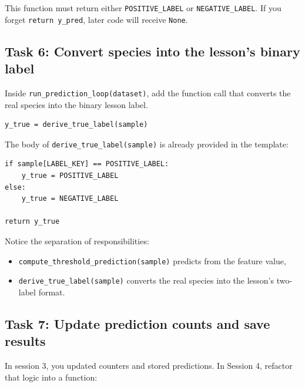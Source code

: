 \begin{tcolorbox}[title=Checkpoint]
This function must return either \texttt{POSITIVE\_LABEL} or \texttt{NEGATIVE\_LABEL}. If you forget \texttt{return y\_pred}, later code will receive \texttt{None}.
\end{tcolorbox}

\subsection{Task 6: Convert species into the lesson's binary label}

\begin{tcolorbox}[title=Task 6: Convert species into the lesson’s binary label]
Inside \texttt{run\_prediction\_loop(dataset)}, add the function call that converts the real species into the binary lesson label.
\end{tcolorbox}

\begin{verbatim}
y_true = derive_true_label(sample)
\end{verbatim}

The body of \texttt{derive\_true\_label(sample)} is already provided in the template:

\begin{verbatim}
if sample[LABEL_KEY] == POSITIVE_LABEL:
    y_true = POSITIVE_LABEL
else:
    y_true = NEGATIVE_LABEL

return y_true
\end{verbatim}

\begin{tcolorbox}[title=Good Practice]
Notice the separation of responsibilities:
\begin{itemize}
    \item \texttt{compute\_threshold\_prediction(sample)} predicts from the feature value,
    \item \texttt{derive\_true\_label(sample)} converts the real species into the lesson's two-label format.
\end{itemize}
\end{tcolorbox}

\subsection{Task 7: Update prediction counts and save results}

In session 3, you updated counters and stored predictions.
In Session 4, refactor that logic into a function:

